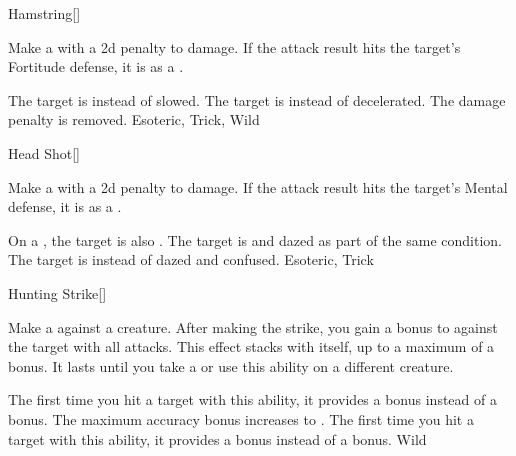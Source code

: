 \lowercase{\hypertarget{maneuver:Hamstring}{}}\label{maneuver:Hamstring}
\hypertarget{maneuver:Hamstring}{}
\begin{freeability}[Rank 1]{Hamstring}[]

Make a  with a \minus2d penalty to damage.
If the attack result hits the target's Fortitude defense,
it is  as a .

\rankline
{} The target is  instead of slowed.
 The target is  instead of decelerated.
 The damage penalty is removed.
 Esoteric, Trick, Wild
\end{freeability}
\vspace{0.25em}



\lowercase{\hypertarget{maneuver:Head Shot}{}}\label{maneuver:Head Shot}
\hypertarget{maneuver:Head Shot}{}
\begin{freeability}[Rank 1]{Head Shot}[]

Make a  with a \minus2d penalty to damage.
If the attack result hits the target's Mental defense,
it is  as a .

\rankline
{} On a , the target is also .
 The target is  and dazed as part of the same condition.
 The target is  instead of dazed and confused.
 Esoteric, Trick
\end{freeability}
\vspace{0.25em}



\lowercase{\hypertarget{maneuver:Hunting Strike}{}}\label{maneuver:Hunting Strike}
\hypertarget{maneuver:Hunting Strike}{}
\begin{freeability}[Rank 1]{Hunting Strike}[]

Make a  against a creature.
After making the strike, you gain a  bonus to  against the target with all attacks.
This effect stacks with itself, up to a maximum of a  bonus.
It lasts until you take a  or use this ability on a different creature.

\rankline
{} The first time you hit a target with this ability, it provides a  bonus instead of a  bonus.
 The maximum accuracy bonus increases to .
 The first time you hit a target with this ability, it provides a  bonus instead of a  bonus.
 Wild
\end{freeability}
\vspace{0.25em}



